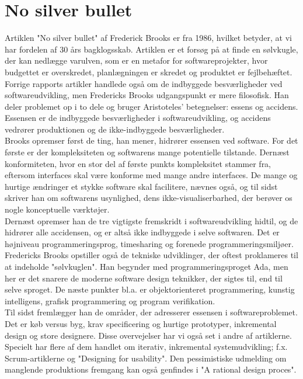\documentclass[12pt]{article}   %
\begin{document}
\section{No silver bullet}
Artiklen "No silver bullet" af Frederick Brooks er fra 1986, hvilket betyder, at vi har fordelen af 30 års bagklogsskab. Artiklen er et forsøg på at finde en sølvkugle, der kan nedlægge varulven, som er en metafor for softwareprojekter, hvor budgettet er overskredet, planlægningen er skredet og produktet er fejlbehæftet. Forrige rapports artikler handlede også om de indbyggede besværligheder ved softwareudvikling, men Fredericks Brooks udgangspunkt er mere filosofisk. Han deler problemet op i to dele og bruger Aristoteles' betegnelser: essens og accidens. Essensen er de indbyggede besværligheder i softwareudvikling, og accidens vedrører produktionen og de ikke-indbyggede besværligheder. \\
Brooks opremser først de ting, han mener, hidrører essensen ved software. For det første er der kompleksiteten og softwarens mange potentielle tilstande. Dernæst konformiteten, hvor en stor del af første punkts kompleksitet stammer fra, eftersom interfaces skal være konforme med mange andre interfaces. De mange og hurtige ændringer et stykke software skal facilitere, nævnes også, og til sidst skriver han om softwarens usynlighed, dens ikke-visualiserbarhed, der berøver os nogle konceptuelle værktøjer. \\
Dernæst opremser han de tre vigtigste fremskridt i softwareudvikling hidtil, og de hidrører alle accidensen, og er altså ikke indbyggede i selve softwaren. Det er højniveau programmeringsprog, timesharing og forenede programmeringsmiljøer. \\
Fredericks Brooks opstiller også de tekniske udviklinger, der oftest proklameres til at indeholde "sølvkuglen". Han begynder med programmeringsproget Ada, men her er det snarere de moderne software design teknikker, der sigtes til, end til selve sproget. De næste punkter bl.a. er objektorienteret programmering, kunstig intelligens, grafisk programmering og program verifikation. \\
Til sidst fremlægger han de områder, der adresserer essensen i softwareproblemet. Det er køb versus byg, krav specificering og hurtige prototyper, inkremental design og store designere. Disse overvejelser har vi også set i andre af artiklerne. Specielt har flere af dem handlet om iterativ, inkremental systemudvikling; f.x. Scrum-artiklerne og "Designing for usability". Den pessimistiske udmelding om manglende produktions fremgang kan også genfindes i "A rational design proces".
\end{document}
